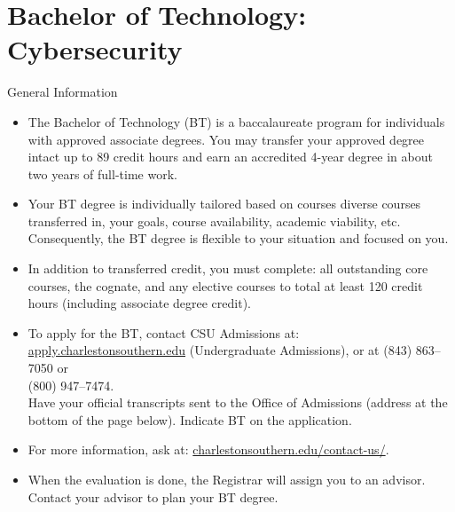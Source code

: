 \label{program:bt-cyber}%
\section*{Bachelor of Technology: Cybersecurity}

\begin{reqgroup}{General Information}
\begin{itemize}\small

	\item The Bachelor of Technology (BT) is a baccalaureate program for individuals with approved associate degrees. You may transfer your approved degree intact up to 89 credit hours and earn an accredited 4-year degree in about two years of full-time work.

	\item Your BT degree is individually tailored based on courses diverse courses transferred in, your goals, course availability, academic viability, etc. Consequently, the BT degree is flexible to your situation and focused on you.

	\item In addition to transferred credit, you must complete: all outstanding core courses, the cognate, and any elective courses to total at least 120 credit hours (including associate degree credit).

	\item To apply for the BT, contact CSU Admissions at:
		\href{https://apply.charlestonsouthern.edu/}{apply.charlestonsouthern.edu} (Undergraduate Admissions), or at (843) 863--7050 or \\(800) 947--7474.\\
		Have your official transcripts sent to the Office of Admissions (address at the bottom of the page below). Indicate BT on the application.

	\item For more information, ask at: \href{https://www.charlestonsouthern.edu/contact-us/}{charlestonsouthern.edu/contact-us/}.


	\item When the evaluation is done, the Registrar will assign you to an advisor. Contact your advisor to plan your BT degree.
\end{itemize}
\end{reqgroup}

